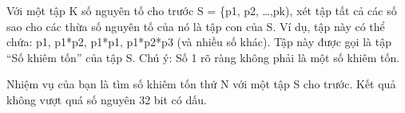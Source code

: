 Với một tập K số nguyên tố cho trước S = \{p1, p2, …,pk), xét tập tất cả các số sao cho các thừa số nguyên tố của nó là tập con của S. Ví dụ, tập này có thể chứa: p1, p1*p2, p1*p1, p1*p2*p3 (và nhiều số khác). Tập này được gọi là tập “Số khiêm tốn” của tập S. Chú ý: Số 1 rõ ràng không phải là một số khiêm tốn.

Nhiệm vụ của bạn là tìm số khiêm tốn thứ N với một tập S cho trước. Kết quả không vượt quá số nguyên 32 bit có dấu.
